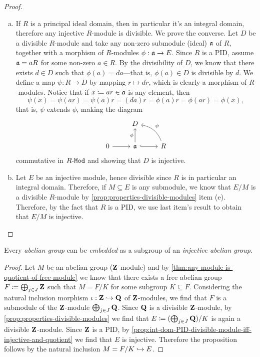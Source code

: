 \begin{proof}
\begin{enumerate}[(a)]\setlength\itemsep{0em}
\item If \(R\) is a principal ideal domain, then in particular it's an integral
  domain, therefore any injective \(R\)-module is divisible. We prove the
  converse. Let \(D\) be a divisible \(R\)-module and take any non-zero
  submodule (ideal) \(\mathfrak{a}\) of \(R\), together with a morphism of
  \(R\)-modules \(\phi: \mathfrak{a} \to E\). Since \(R\) is a PID, assume
  \(\mathfrak{a} = a R\) for some non-zero \(a \in R\). By the divisibility of
  \(D\), we know that there exists \(d \in D\) such that
  \(\phi(a) = d a\)---that is, \(\phi(a) \in D\) is divisible by \(d\). We
  define a map \(\psi: R \to D\) by mapping \(r \mapsto d r\), which is clearly
  a morphism of \(R\)-modules. Notice that if \(x \coloneq a r \in \mathfrak{a}\) is
  any element, then
  \[
  \psi(x) = \psi(a r) = \psi(a) r = (d a) r = \phi(a) r = \phi(a r) = \phi(x),
  \]
  that is, \(\psi\) extends \(\phi\), making the diagram
  \[
  \begin{tikzcd}
  &D &
  \\
  0 \ar[r] &\ideal a \ar[u, "\phi"] \ar[r, hook]
  &R \ar[lu, "\psi"', bend right]
  \end{tikzcd}
  \]
  commutative in \({R\text{-}\texttt{Mod}}\) and showing that \(D\) is injective.

\item Let \(E\) be an injective module, hence divisible since \(R\) is in
  particular an integral domain. Therefore, if \(M \subseteq E\) is any
  submodule, we know that \(E/M\) is a divisible \(R\)-module by
  \cref{prop:properties-divisible-modules} item (e). Therefore, by the fact that
  \(R\) is a PID, we use last item's result to obtain that \(E/M\) is
  injective.
\end{enumerate}
\end{proof}

\begin{corollary}
\label{cor:abelian-group-embedded-injective-abelian-group}
Every \emph{abelian group} can be \emph{embedded} as a subgroup of an
\emph{injective abelian group}.
\end{corollary}

\begin{proof}
Let \(M\) be an abelian group (\(\mathbf{Z}\)-module) and by
\cref{thm:any-module-is-quotient-of-free-module} we know that there exists a
free abelian group \(F \coloneq \bigoplus_{j \in J} \mathbf{Z}\) such that \(M = F/K\)
for some subgroup \(K \subseteq F\). Considering the natural inclusion morphism
\(\iota: \mathbf{Z} \hookrightarrow \mathbf{Q}\) of \(\mathbf{Z}\)-modules, we find that \(F\) is a submodule of
the \(\mathbf{Z}\)-module \(\bigoplus_{j \in J} \mathbf{Q}\). Since \(\mathbf{Q}\) is a divisible
\(\mathbf{Z}\)-module, by \cref{prop:properties-divisible-modules} we find that
\(E \coloneq (\bigoplus_{j \in J} \mathbf{Q})/K\) is again a divisible
\(\mathbf{Z}\)-module. Since \(\mathbf{Z}\) is a PID, by
\cref{prop:int-dom-PID-divisible-module-iff-injective-and-quotient} we find that
\(E\) is injective. Therefore the proposition follows by the natural inclusion
\(M = F/K \hookrightarrow E\).
\end{proof}

